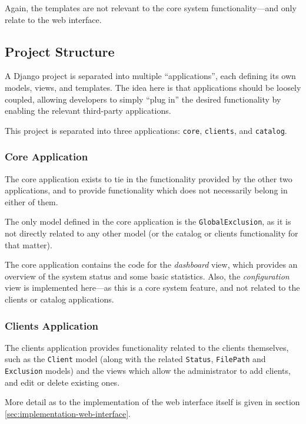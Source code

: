 Again, the templates are not relevant to the core system functionality---and
only relate to the web interface.

\subsection{Project Structure}

A Django project is separated into multiple ``applications'', each defining its
own models, views, and templates. The idea here is that applications should be
loosely coupled, allowing developers to simply ``plug in'' the desired
functionality by enabling the relevant third-party applications.

This project is separated into three applications: \verb!core!, \verb!clients!,
and \verb!catalog!.

\subsubsection{Core Application}

The core application exists to tie in the functionality provided by the other
two applications, and to provide functionality which does not necessarily
belong in either of them.

The only model defined in the core application is the \verb!GlobalExclusion!,
as it is not directly related to any other model (or the catalog or clients
functionality for that matter).

The core application contains the code for the \emph{dashboard} view, which
provides an overview of the system status and some basic statistics. Also, the
\emph{configuration} view is implemented here---as this is a core system
feature, and not related to the clients or catalog applications.

\subsubsection{Clients Application}

The clients application provides functionality related to the clients
themselves, such as the \verb!Client! model (along with the related
\verb!Status!, \verb!FilePath! and \verb!Exclusion! models) and the views which
allow the administrator to add clients, and edit or delete existing ones.

More detail as to the implementation of the web interface itself is given in
section \ref{sec:implementation-web-interface}.

